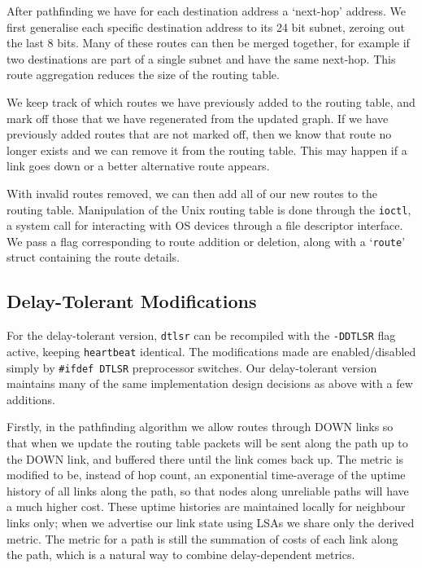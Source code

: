 \documentclass[10pt,twoside,a4paper]{article}
\begin{document}
After pathfinding we have for each destination address a `next-hop' address. We first generalise each specific destination address to its 24 bit subnet, zeroing out the last 8 bits. Many of these routes can then be merged together, for example if two destinations are part of a single subnet and have the same next-hop. This route aggregation reduces the size of the routing table.

We keep track of which routes we have previously added to the routing table, and mark off those that we have regenerated from the updated graph. If we have previously added routes that are not marked off, then we know that route no longer exists and we can remove it from the routing table. This may happen if a link goes down or a better alternative route appears.

With invalid routes removed, we can then add all of our new routes to the routing table. Manipulation of the Unix routing table is done through the \texttt{ioctl}, a system call for interacting with OS devices through a file descriptor interface. We pass a flag corresponding to route addition or deletion, along with a `\texttt{route}' struct containing the route details.

\subsection{Delay-Tolerant Modifications}

For the delay-tolerant version, \texttt{dtlsr} can be recompiled with the \texttt{-DDTLSR} flag active, keeping \texttt{heartbeat} identical. The modifications made are enabled/disabled simply by \texttt{\#ifdef DTLSR} preprocessor switches. Our delay-tolerant version maintains many of the same implementation design decisions as above with a few additions.

Firstly, in the pathfinding algorithm we allow routes through DOWN links so that when we update the routing table packets will be sent along the path up to the DOWN link, and buffered there until the link comes back up. The metric is modified to be, instead of hop count, an exponential time-average of the uptime history of all links along the path, so that nodes along unreliable paths will have a much higher cost. These uptime histories are maintained locally for neighbour links only; when we advertise our link state using LSAs we share only the derived metric. The metric for a path is still the summation of costs of each link along the path, which is a natural way to combine delay-dependent metrics.
\end{document}
